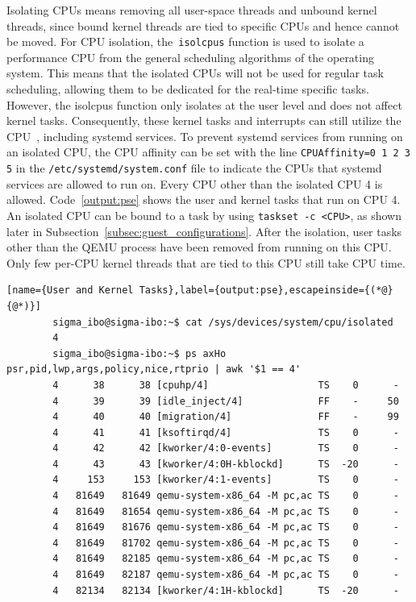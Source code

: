 \documentclass[MMR,Master,english]{twbook}
\begin{document}
Isolating CPUs means removing all user-space threads and unbound kernel threads, since bound kernel threads are tied to specific CPUs and hence cannot be moved. For CPU isolation, the~\texttt{isolcpus} function is used to isolate a performance CPU from the general scheduling algorithms of the operating system. This means that the isolated CPUs will not be used for regular task scheduling, allowing them to be dedicated for the real-time specific tasks. However, the isolcpus function only isolates at the user level and does not affect kernel tasks. Consequently, these kernel tasks and interrupts can still utilize the CPU~\cite{maPerformanceTuningKVMbased}, including systemd services. To prevent systemd services from running on an isolated CPU, the CPU affinity can be set with the line \texttt{CPUAffinity=0 1 2 3 5} in the \texttt{/etc/systemd/system.conf} file to indicate the CPUs that systemd services are allowed to run on. Every CPU other than the isolated CPU 4 is allowed. Code~\ref{output:pse} shows the user and kernel tasks that run on CPU 4. An isolated CPU can be bound to a task by using \texttt{taskset -c <CPU>}, as shown later in Subsection~\ref{subsec:guest_configurations}. After the isolation, user tasks other than the QEMU process have been removed from running on this CPU. Only few per-CPU kernel threads that are tied to this CPU still take CPU time.

\vspace{2em}
\begin{lstlisting}[name={User and Kernel Tasks},label={output:pse},escapeinside={(*@}{@*)}]
		sigma_ibo@sigma-ibo:~$ cat /sys/devices/system/cpu/isolated
		4
		sigma_ibo@sigma-ibo:~$ ps axHo psr,pid,lwp,args,policy,nice,rtprio | awk '$1 == 4'
		4      38      38 [cpuhp/4]                   TS    0      -
		4      39      39 [idle_inject/4]             FF    -     50
		4      40      40 [migration/4]               FF    -     99
		4      41      41 [ksoftirqd/4]               TS    0      -
		4      42      42 [kworker/4:0-events]        TS    0      -
		4      43      43 [kworker/4:0H-kblockd]      TS  -20      -
		4     153     153 [kworker/4:1-events]        TS    0      -
		4   81649   81649 qemu-system-x86_64 -M pc,ac TS    0      -
		4   81649   81654 qemu-system-x86_64 -M pc,ac TS    0      -
		4   81649   81676 qemu-system-x86_64 -M pc,ac TS    0      -
		4   81649   81702 qemu-system-x86_64 -M pc,ac TS    0      -
		4   81649   82185 qemu-system-x86_64 -M pc,ac TS    0      -
		4   81649   82187 qemu-system-x86_64 -M pc,ac TS    0      -
		4   82134   82134 [kworker/4:1H-kblockd]      TS  -20      -
\end{lstlisting}
\end{document}
